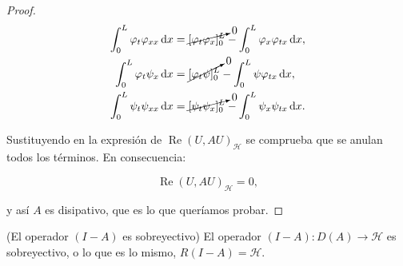 \begin{proof}
    \begin{align*}
        \int_0^L \varphi_t \varphi_{xx} \, \mathrm{d} x &= \cancelto{0}{[\varphi_t \varphi_x]_0^L} - \int_0^L \varphi_x \varphi_{tx} \, \mathrm{d} x,\\
        \int_0^L\varphi_t \psi_x \, \mathrm{d} x &= \cancelto{0}{[\varphi_t \psi]_0^L} - \int_0^L \psi \varphi_{tx} \, \mathrm{d} x,\\
        \int_0^L \psi_t \psi_{xx} \, \mathrm{d} x &= \cancelto{0}{[\psi_t \psi_x]_0^L} - \int_0^L \psi_x \psi_{tx} \, \mathrm{d} x.
    \end{align*}

    Sustituyendo en la expresión de $\operatorname{Re}(U,AU)_{\mathcal{H}}$ se comprueba que se anulan todos los términos. En consecuencia:

    \[\operatorname{Re}(U,AU)_{\mathcal{H}} = 0,\]

    y así $A$ es disipativo, que es lo que queríamos probar.
\end{proof}

\begin{Proposicion}{(El operador $(I - A)$ es sobreyectivo)}
\label{ch:teoriaVigas:prop:ResolventeEsSobreyect}
    El operador $(I-A) : D(A) \rightarrow \mathcal{H}$ es sobreyectivo, o lo que es lo mismo, $R(I-A) = \mathcal{H}$.
\end{Proposicion}

